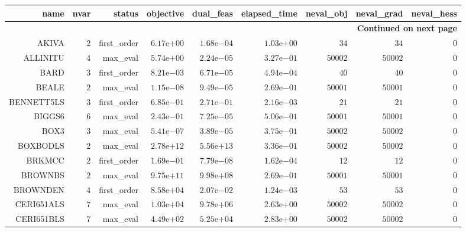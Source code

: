 \begin{longtable}{rrrrrrrrr}
\hline
name & nvar & status & objective & dual\_feas & elapsed\_time & neval\_obj & neval\_grad & neval\_hess \\\hline
\endhead
\hline
\multicolumn{9}{r}{{\bfseries Continued on next page}}\\
\hline
\endfoot
\endlastfoot
AKIVA & \(     2\) & first\_order & \( 6.17\)e\(+00\) & \( 1.68\)e\(-04\) & \( 1.03\)e\(+00\) & \(    34\) & \(    34\) & \(     0\) \\
ALLINITU & \(     4\) & max\_eval & \( 5.74\)e\(+00\) & \( 2.24\)e\(-05\) & \( 3.27\)e\(-01\) & \( 50002\) & \( 50002\) & \(     0\) \\
BARD & \(     3\) & first\_order & \( 8.21\)e\(-03\) & \( 6.71\)e\(-05\) & \( 4.94\)e\(-04\) & \(    40\) & \(    40\) & \(     0\) \\
BEALE & \(     2\) & max\_eval & \( 1.15\)e\(-08\) & \( 9.49\)e\(-05\) & \( 2.69\)e\(-01\) & \( 50001\) & \( 50001\) & \(     0\) \\
BENNETT5LS & \(     3\) & first\_order & \( 6.85\)e\(-01\) & \( 2.71\)e\(-01\) & \( 2.16\)e\(-03\) & \(    21\) & \(    21\) & \(     0\) \\
BIGGS6 & \(     6\) & max\_eval & \( 2.43\)e\(-01\) & \( 7.25\)e\(-05\) & \( 5.06\)e\(-01\) & \( 50001\) & \( 50001\) & \(     0\) \\
BOX3 & \(     3\) & max\_eval & \( 5.41\)e\(-07\) & \( 3.89\)e\(-05\) & \( 3.75\)e\(-01\) & \( 50002\) & \( 50002\) & \(     0\) \\
BOXBODLS & \(     2\) & max\_eval & \( 2.78\)e\(+12\) & \( 5.56\)e\(+13\) & \( 3.36\)e\(-01\) & \( 50002\) & \( 50002\) & \(     0\) \\
BRKMCC & \(     2\) & first\_order & \( 1.69\)e\(-01\) & \( 7.79\)e\(-08\) & \( 1.62\)e\(-04\) & \(    12\) & \(    12\) & \(     0\) \\
BROWNBS & \(     2\) & max\_eval & \( 9.75\)e\(+11\) & \( 9.98\)e\(+08\) & \( 2.69\)e\(-01\) & \( 50001\) & \( 50001\) & \(     0\) \\
BROWNDEN & \(     4\) & first\_order & \( 8.58\)e\(+04\) & \( 2.07\)e\(-02\) & \( 1.24\)e\(-03\) & \(    53\) & \(    53\) & \(     0\) \\
CERI651ALS & \(     7\) & max\_eval & \( 1.03\)e\(+04\) & \( 9.78\)e\(+06\) & \( 2.63\)e\(+00\) & \( 50002\) & \( 50002\) & \(     0\) \\
CERI651BLS & \(     7\) & max\_eval & \( 4.49\)e\(+02\) & \( 5.25\)e\(+04\) & \( 2.83\)e\(+00\) & \( 50002\) & \( 50002\) & \(     0\) \\

\end{longtable}
